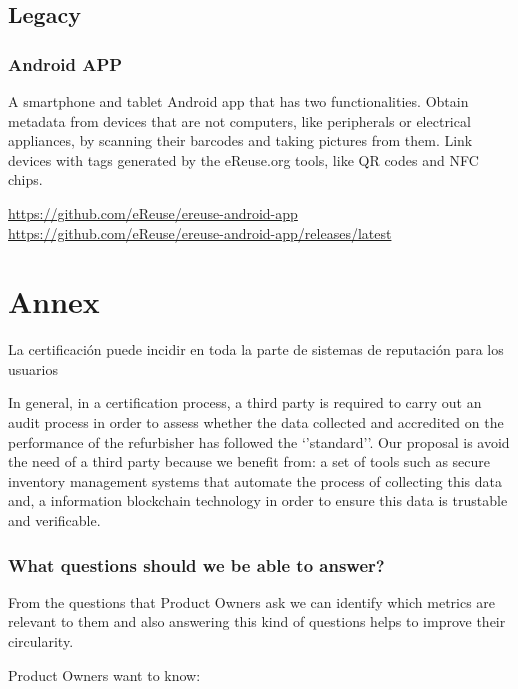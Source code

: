 \documentclass[
]{book}
\begin{document}
\hypertarget{legacy}{%
\section{Legacy}\label{legacy}}

\hypertarget{android-app}{%
\subsection{Android APP}\label{android-app}}

A smartphone and tablet Android app that has two functionalities.
Obtain metadata from devices that are not computers, like peripherals or electrical appliances, by scanning their barcodes and taking pictures from them.
Link devices with tags generated by the eReuse.org tools, like QR codes and NFC chips.

\url{https://github.com/eReuse/ereuse-android-app}
\url{https://github.com/eReuse/ereuse-android-app/releases/latest}

\hypertarget{annex}{%
\chapter{Annex}\label{annex}}

La certificación puede incidir en toda la parte de sistemas de reputación para los usuarios

In general, in a certification process, a third party is required to carry out an audit process in order to assess whether the data collected and accredited on the performance of the refurbisher has followed the `'standard''. Our proposal is avoid the need of a third party because we benefit from: a set of tools such as secure inventory management systems that automate the process of collecting this data and, a information blockchain technology in order to ensure this data is trustable and verificable.

\hypertarget{what-questions-should-we-be-able-to-answer}{%
\subsection{What questions should we be able to answer?}\label{what-questions-should-we-be-able-to-answer}}

From the questions that Product Owners ask we can identify which metrics are relevant to them and also answering this kind of questions helps to improve their circularity.

Product Owners want to know:
\end{document}
